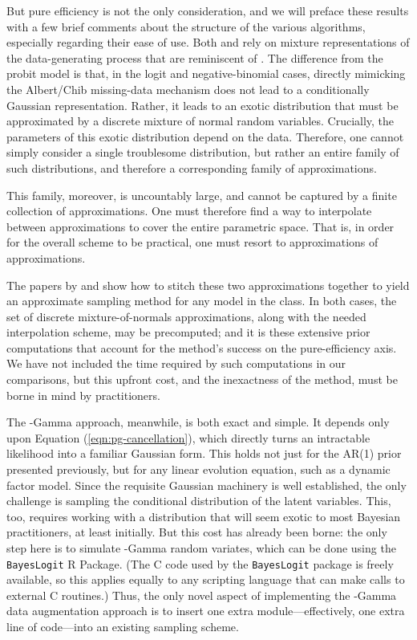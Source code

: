 But pure efficiency is not the only consideration, and we will preface these
results with a few brief comments about the structure of the various algorithms,
especially regarding their ease of use.  Both \cite{fussl-etal-2013} and
\cite{fruhwirth-schnatter-etal-2009} rely on mixture representations of the
data-generating process that are reminiscent of \cite{albert-chib-1993}.  The
difference from the probit model is that, in the logit and negative-binomial
cases, directly mimicking the Albert/Chib missing-data mechanism does not lead
to a conditionally Gaussian representation.  Rather, it leads to an exotic
distribution that must be approximated by a discrete mixture of normal random
variables.  Crucially, the parameters of this exotic distribution depend on the
data.  Therefore, one cannot simply consider a single troublesome distribution,
but rather an entire family of such distributions, and therefore a corresponding
family of approximations.

This family, moreover, is uncountably large, and cannot be captured by a finite
collection of approximations.  One must therefore find a way to interpolate
between approximations to cover the entire parametric space.  That is, in order
for the overall scheme to be practical, one must resort to approximations of
approximations.

The papers by \cite{fussl-etal-2013} and \cite{fruhwirth-schnatter-etal-2009}
show how to stitch these two approximations together to yield an approximate
sampling method for any model in the class.  In both cases, the set of discrete
mixture-of-normals approximations, along with the needed interpolation scheme,
may be precomputed; and it is these extensive prior computations that account
for the method's success on the pure-efficiency axis.  We have not included the
time required by such computations in our comparisons, but this upfront cost,
and the inexactness of the method, must be borne in mind by practitioners.

The \Polya-Gamma approach, meanwhile, is both exact and simple.  It depends only
upon Equation (\ref{eqn:pg-cancellation}), which directly turns an
intractable likelihood into a familiar Gaussian form.  This holds not just for
the AR(1) prior presented previously, but for any linear evolution equation,
such as a dynamic factor model.  Since the requisite Gaussian machinery is well
established, the only challenge is sampling the conditional distribution of the
latent variables.  This, too, requires working with a distribution that will
seem exotic to most Bayesian practitioners, at least initially.  But this cost
has already been borne: the only step here is to simulate \Polya-Gamma random
variates, which can be done using the \texttt{BayesLogit} R Package.  (The C
code used by the \texttt{BayesLogit} package is freely available, so this
applies equally to any scripting language that can make calls to external C
routines.)  Thus, the only novel aspect of implementing the \Polya-Gamma data
augmentation approach is to insert one extra module---effectively, one extra
line of code---into an existing sampling scheme.

